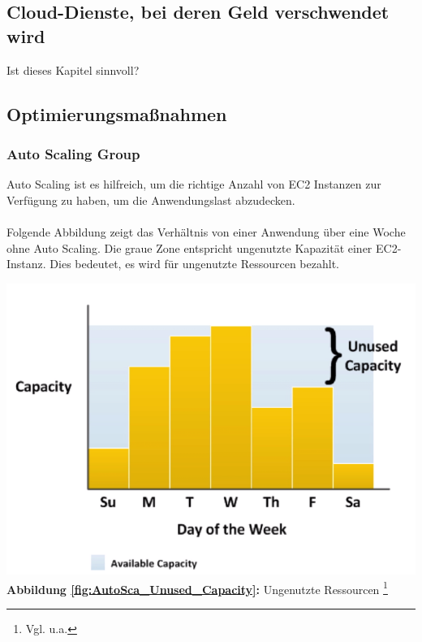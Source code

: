 \paragraph{}

\subsection{Cloud-Dienste, bei deren Geld verschwendet wird}
Ist dieses Kapitel sinnvoll?

\subsection{Optimierungsmaßnahmen}

\subsubsection{Auto Scaling Group }
Auto Scaling ist es hilfreich, um die richtige Anzahl von EC2 Instanzen zur Verfügung zu haben, um die Anwendungslast abzudecken.
\\\\
Folgende Abbildung zeigt das Verhältnis von einer Anwendung über eine Woche ohne Auto Scaling.
Die graue Zone entspricht ungenutzte Kapazität einer EC2-Instanz. Dies bedeutet, es wird für ungenutzte Ressourcen bezahlt.
\begin{center}
    \includegraphics[scale=0.7]{sources/AutoCap Unused Capacity}\label{fig:AutoSca_Unused_Capacity}\\
    \textbf{Abbildung \autoref{fig:AutoSca_Unused_Capacity}:} Ungenutzte Ressourcen
    \footnote{Vgl. u.a.\cite{AMZ01}}
\end{center}




